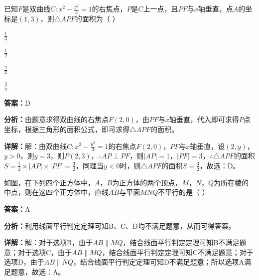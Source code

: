 \begin{question}[points=5]
已知$F$是双曲线$C:x^2-\frac{y^2}{3}=1$的右焦点，$P$是$C$上一点，且$PF$与$x$轴垂直，点$A$的坐标是$(1,3)$，则$\triangle APF$的面积为（             ）
\begin{choices}
  \item $\frac{1}{3}$
  \item $\frac{1}{2}$
  \item $\frac{2}{3}$
  \item $\frac{3}{2}$
\end{choices}
\begin{solution}
\textbf{答案：}D

\textbf{分析：}由题意求得双曲线的右焦点$F(2,0)$，由$PF$与$x$轴垂直，代入即可求得$P$点坐标，根据三角形的面积公式，即可求得$\triangle APF$的面积。

\textbf{详解：}解：由双曲线$C:x^2-\frac{y^2}{3}=1$的右焦点$F(2,0)$，$PF$与$x$轴垂直，设$(2,y)$，$y>0$，则$y=3$，则$P(2,3)$，$\therefore AP\perp PF$，则$|AP|=1$，$|PF|=3$，$\therefore\triangle APF$的面积$S=\frac{1}{2}\times|AP|\times|PF|=\frac{3}{2}$，同理当$y<0$时，则$\triangle APF$的面积$S=\frac{3}{2}$，故选：D。
\end{solution}
\end{question}

\begin{question}[points=5]
如图，在下列四个正方体中，$A$，$B$为正方体的两个顶点，$M$，$N$，$Q$为所在棱的中点，则在这四个正方体中，直线$AB$与平面$MNQ$不平行的是（     ）
\begin{choices}
  \item 
  \item 
  \item 
  \item 
\end{choices}
\begin{solution}
\textbf{答案：}A

\textbf{分析：}利用线面平行判定定理可知B、C、D均不满足题意，从而可得答案。

\textbf{详解：}解：对于选项B，由于$AB\parallel MQ$，结合线面平行判定定理可知B不满足题意；对于选项C，由于$AB\parallel MQ$，结合线面平行判定定理可知C不满足题意；对于选项D，由于$AB\parallel NQ$，结合线面平行判定定理可知D不满足题意；所以选项A满足题意，故选：A。
\end{solution}
\end{question}

